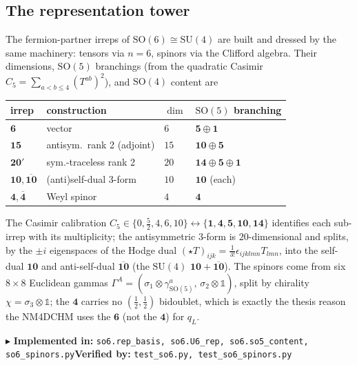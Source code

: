\documentclass[11pt]{article}
\newcommand{\SO}[1]{\mathrm{SO}(#1)}
\newcommand{\SU}[1]{\mathrm{SU}(#1)}
\newcommand{\code}[1]{\texttt{#1}}
\newcommand{\impl}[2]{\par\smallskip\noindent\textcolor{blue!60!black}{\small$\blacktriangleright$ \textbf{Implemented in:} \code{#1}\quad\textbf{Verified by:} \code{#2}}\par\smallskip}
\begin{document}
\subsection{The representation tower}
The fermion-partner irreps of $\SO6\cong\SU4$ are built and dressed by the same machinery:
tensors via $n=6$, spinors via the Clifford algebra. Their dimensions, $\SO5$ branchings (from the
quadratic Casimir $C_5=\sum_{a<b\le4}(T^{ab})^2$), and $\SO4$ content are
\begin{center}
\begin{tabular}{llll}
\toprule
irrep & construction & $\dim$ & $\SO5$ branching\\
\midrule
$\mathbf 6$ & vector & $6$ & $\mathbf 5\oplus\mathbf 1$\\
$\mathbf{15}$ & antisym.\ rank 2 (adjoint) & $15$ & $\mathbf{10}\oplus\mathbf 5$\\
$\mathbf{20'}$ & sym.-traceless rank 2 & $20$ & $\mathbf{14}\oplus\mathbf 5\oplus\mathbf 1$\\
$\mathbf{10},\overline{\mathbf{10}}$ & (anti)self-dual 3-form & $10$ & $\mathbf{10}$ (each)\\
$\mathbf 4,\overline{\mathbf 4}$ & Weyl spinor & $4$ & $\mathbf 4$\\
\bottomrule
\end{tabular}
\end{center}
The Casimir calibration $C_5\in\{0,\tfrac52,4,6,10\}\leftrightarrow\{\mathbf1,\mathbf4,\mathbf5,\mathbf{10},\mathbf{14}\}$
identifies each sub-irrep with its multiplicity; the antisymmetric 3-form is $20$-dimensional and
splits, by the $\pm i$ eigenspaces of the Hodge dual $(\star T)_{ijk}=\tfrac{1}{3!}\epsilon_{ijklmn}T_{lmn}$,
into the self-dual $\mathbf{10}$ and anti-self-dual $\overline{\mathbf{10}}$ (the $\SU4$
$\mathbf{10}+\overline{\mathbf{10}}$). The spinors come from six $8\times8$ Euclidean gammas
$\Gamma^A=(\sigma_1\!\otimes\!\gamma^a_{\SO5},\,\sigma_2\!\otimes\!\mathbb 1)$, split by chirality
$\chi=\sigma_3\otimes\mathbb 1$; the $\mathbf 4$ carries no $(\tfrac12,\tfrac12)$ bidoublet, which
is exactly the thesis reason the NM4DCHM uses the $\mathbf 6$ (not the $\mathbf 4$) for $q_L$.
\impl{so6.rep\_basis, so6.U6\_rep, so6.so5\_content, so6\_spinors.py}{test\_so6.py, test\_so6\_spinors.py}
\end{document}
